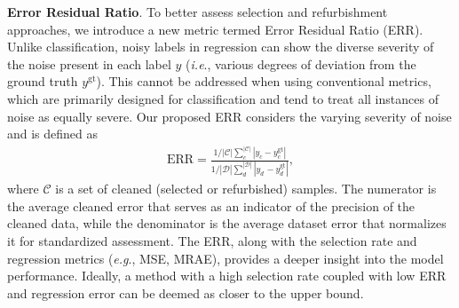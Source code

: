 \documentclass{article}
\def\eg{\textit{e.g}., } \def\Eg{\textit{E.g}., }
\def\ie{\textit{i.e}., } \def\Ie{\textit{I.e}., }
\theoremstyle{plain}
\theoremstyle{definition}
\theoremstyle{remark}
\begin{document}
\textbf{Error Residual Ratio}. 
To better assess selection and refurbishment approaches, we introduce a new metric termed Error Residual Ratio (ERR).
Unlike classification, noisy labels in regression can show the diverse severity of the noise present in each label $y$ (\ie various degrees of deviation from the ground truth $y^\text{gt}$). 
This cannot be addressed when using conventional metrics, which are primarily designed for classification and tend to treat all instances of noise as equally severe. 
Our proposed ERR considers the varying severity of noise and is defined as
\begin{gather}\label{eq:ERR}
   \text{ERR} = \frac{1/|\mathcal{C}|\sum_c^{|\mathcal{C}|} |y_c - y^\text{gt}_c|}{1/|\mathcal{D}|\sum_d^{|\mathcal{D}|} |{y}^\text{ }_d - y^\text{gt}_d|},
\end{gather}
where $\mathcal{C}$ is a set of cleaned (selected or refurbished) samples. 
The numerator is the average cleaned error that serves as an indicator of the precision of the cleaned data, while the denominator is the average dataset error that normalizes it for standardized assessment.
The ERR, along with the selection rate and regression metrics (\eg MSE, MRAE), provides a deeper insight into the model performance.
Ideally, a method with a high selection rate coupled with low ERR and regression error can be deemed as closer to the upper bound.
\end{document}
